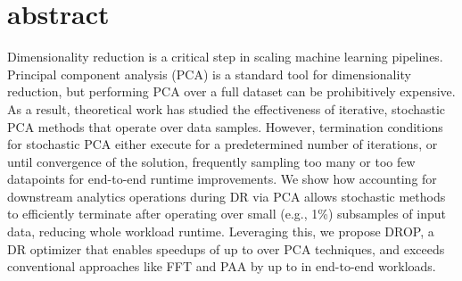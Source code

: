 \section*{abstract}
Dimensionality reduction is a critical step in scaling machine learning pipelines. Principal component analysis (PCA) is a standard tool for dimensionality reduction, but performing PCA over a full dataset can be prohibitively expensive. 
As a result, theoretical work has studied the effectiveness of iterative, stochastic PCA methods that operate over data samples. 
However, termination conditions for stochastic PCA either execute for a predetermined number of iterations, or until convergence of the solution, frequently sampling too many or too few datapoints for end-to-end runtime improvements. We show how accounting for downstream analytics operations during DR via PCA allows stochastic methods to efficiently terminate after operating over small (e.g., 1\%) subsamples of input data, reducing whole workload runtime. 
Leveraging this, we propose DROP, a DR optimizer that enables speedups of up to \red{$5\times$} over  PCA techniques, and exceeds conventional approaches like FFT and PAA by up to \red{$16\times$} in end-to-end workloads.










